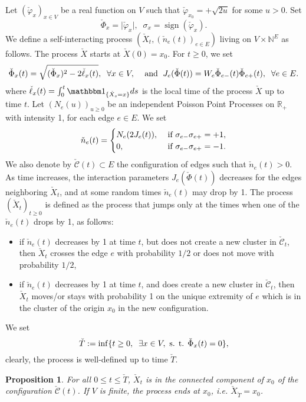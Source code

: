 \documentclass[11pt,a4paper]{amsart}
\numberwithin{equation}{section}
\newtheorem{proposition}{Proposition}[section]
\def\ccc{{\mathcal C}}
\def\R{{\mathbb R}}
\def\indic{{{\mathbbm 1}}}
\begin{document}
Let $(\check \varphi_x)_{x\in V}$ be a real function on $V$ such that
$\check\varphi_{x_0}=+\sqrt{2u}$ for some $u>0$. Set 
$$
\check \Phi_x=\vert\check\varphi_x\vert, \;\;\sigma_x=\operatorname{sign}(\check\varphi_x).
$$
We define a self-interacting process $(\check X_t, (\check n_e(t))_{e\in E})$ living on $V\times {\mathbb{N}}^E$ as follows.
The process $\check X$ starts at $\check X(0)=x_0$.
For $t\ge 0$, we set
$$
\check\Phi_x(t)=\sqrt{(\check\Phi_x)^2-2\check\ell_x(t)},\;\;\forall x\in V,\;\;\;\hbox{ and }\;
J_e(\check\Phi(t))=W_e \check\Phi_{e-}(t)\check\Phi_{e+}(t), \;\; \forall e\in E.
$$
where $\check\ell_x(t)=\int_0^t\indic_{\{\check X_s=x\}}ds$ is the local time of the process $\check X$ up to time $t$.
Let $(N_e(u))_{u\ge 0}$ be an independent Poisson Point Processes on $\R_+$ with intensity 1, for each edge $e\in E$.
We set
$$
\check n_e(t)=
\begin{cases} 
N_e(2J_e(t)), &\hbox{ if } \sigma_{e-}\sigma_{e+}=+1,
\\
0, &\hbox{ if } \sigma_{e-}\sigma_{e+}=-1.
\end{cases}
$$
We also denote by $\check \ccc(t)\subset E$ the configuration of edges such that $\check n_e(t)>0$.
As time increases, the interaction parameters $J_{e}(\check\Phi(t))$ decreases for the edges neighboring $\check X_t$, and at some random times $\check n_e(t)$ may drop
by 1.
The process $(\check X_t)_{t\ge 0}$ is defined as the process that jumps only at the times when one of the $\check n_e(t)$ drops by 1, as follows:
\begin{itemize}
\item
if $\check n_e(t)$ decreases by 1 at time $t$, but does not create a new cluster in $\check \ccc_t$, then $\check X_t$ crosses the edge
$e$ with probability ${1/2}$ or does not move with probability ${1/2}$,
\item
if $\check n_e(t)$ decreases by 1 at time $t$, and does create a new cluster in $\check \ccc_t$,
 then $\check X_t$ moves/or stays with probability 1 on the unique extremity
of $e$ which is in the cluster of the origin $x_0$ in the new configuration.
\end{itemize}
We set
$$
\check T:=\inf\{t\ge 0,\;\;  \exists x\in V, \hbox{ s. t. } \check\Phi_x(t)=0\},
$$
clearly, the process is well-defined up to time $\check T$.
\begin{proposition}
For all $0\le t\le \check T$, $\check X_t$ is in the connected component of $x_0$ of the configuration $\check \ccc(t)$. If $V$ is finite,
the process ends at $x_0$, i.e. $\check X_{\check T}=x_0$.
\end{proposition}
\end{document}
